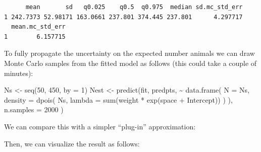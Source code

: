 \documentclass[
  letterpaper,
  DIV=11,
  numbers=noendperiod]{scrartcl}
\newenvironment{Shaded}{\begin{snugshade}}{\end{snugshade}}
\newcommand{\AttributeTok}[1]{\textcolor[rgb]{0.40,0.45,0.13}{#1}}
\newcommand{\DecValTok}[1]{\textcolor[rgb]{0.68,0.00,0.00}{#1}}
\newcommand{\FunctionTok}[1]{\textcolor[rgb]{0.28,0.35,0.67}{#1}}
\newcommand{\NormalTok}[1]{\textcolor[rgb]{0.00,0.23,0.31}{#1}}
\newcommand{\OtherTok}[1]{\textcolor[rgb]{0.00,0.23,0.31}{#1}}
\newcommand{\SpecialCharTok}[1]{\textcolor[rgb]{0.37,0.37,0.37}{#1}}
\newcommand{\StringTok}[1]{\textcolor[rgb]{0.13,0.47,0.30}{#1}}
\begin{document}
\begin{verbatim}
      mean       sd   q0.025    q0.5  q0.975  median sd.mc_std_err
1 242.7373 52.98171 163.0661 237.801 374.445 237.801      4.297717
  mean.mc_std_err
1        6.157715
\end{verbatim}

To fully propagate the uncertainty on the expected number animals we can
draw Monte Carlo samples from the fitted model as follows (this could
take a couple of minutes):

\begin{Shaded}
\begin{Highlighting}[]
\NormalTok{Ns }\OtherTok{\textless{}{-}} \FunctionTok{seq}\NormalTok{(}\DecValTok{50}\NormalTok{, }\DecValTok{450}\NormalTok{, }\AttributeTok{by =} \DecValTok{1}\NormalTok{)}
\NormalTok{Nest }\OtherTok{\textless{}{-}} \FunctionTok{predict}\NormalTok{(fit, predpts,}
  \SpecialCharTok{\textasciitilde{}} \FunctionTok{data.frame}\NormalTok{(}
    \AttributeTok{N =}\NormalTok{ Ns,}
    \AttributeTok{density =} \FunctionTok{dpois}\NormalTok{(}
\NormalTok{      Ns,}
      \AttributeTok{lambda =} \FunctionTok{sum}\NormalTok{(weight }\SpecialCharTok{*} \FunctionTok{exp}\NormalTok{(space }\SpecialCharTok{+}\NormalTok{ Intercept))}
\NormalTok{    )}
\NormalTok{  ),}
  \AttributeTok{n.samples =} \DecValTok{2000}
\NormalTok{)}
\end{Highlighting}
\end{Shaded}

We can compare this with a simpler ``plug-in'' approximation:

\begin{Shaded}
\end{Shaded}

Then, we can visualize the result as follows:
\end{document}
